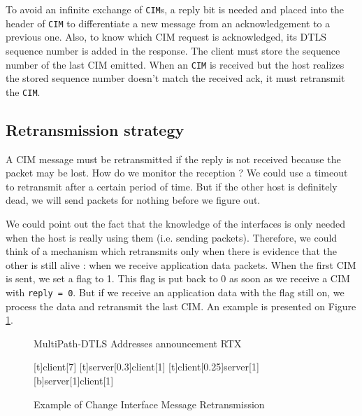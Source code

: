 To avoid an infinite exchange of \texttt{CIM}s, a reply bit is needed and placed into the header of \texttt{CIM} to differentiate a new message from an acknowledgement to a previous one. Also, to know which CIM request is acknowledged, its DTLS sequence number is added in the response. The client must store the sequence number of the last CIM emitted. When an \texttt{CIM} is received but the host realizes the stored sequence number doesn't match the received ack, it must retransmit the \texttt{CIM}.

\subsection{Retransmission strategy}

A CIM message must be retransmitted if the reply is not received because the packet may be lost. How do we monitor the reception ? We could use a timeout to retransmit after a certain period of time. But if the other host is definitely dead, we will send packets for nothing before we figure out.

We could point out the fact that the knowledge of the interfaces is only needed when the host is really using them (i.e. sending packets). Therefore, we could think of a mechanism which retransmits only when there is evidence that the other is still alive : when we receive application data packets. When the first CIM is sent, we set a flag to 1. This flag is put back to 0 as soon as we receive a CIM with \verb$reply = 0$. But if we receive an application data with the flag still on, we process the data and retransmit the last CIM. An example is presented on Figure \ref{fig:CIMexchange2}.

\begin{figure}[!h]
\centering
\begin{msc}[r]{MultiPath-DTLS Addresses announcement RTX}

\setlength{\instfootheight}{0em}
\setlength{\instheadheight}{0em}
\setlength{\instdist}{0.7\linewidth}
\setlength{\levelheight}{3em}


[t]{}{client}[7]
\nextlevel
{}[t]{server}[0.3]{client}[1]
\nextlevel
{}[t]{client}[0.25]{server}[1]
\nextlevel
{}[b]{server}[1]{client}[1]
\nextlevel
\nextlevel

\end{msc}
\caption{Example of Change Interface Message Retransmission}
\label{fig:CIMexchange2}
\end{figure}


